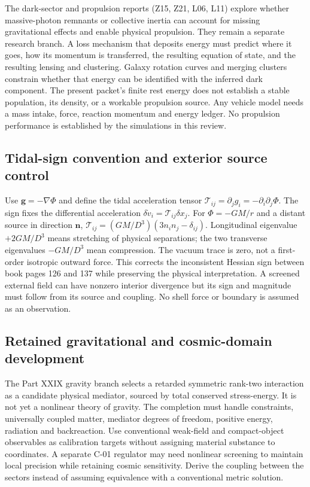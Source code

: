 \documentclass[
  11pt,
  twoside]{article}
\begin{document}
The dark-sector and propulsion reports (Z15, Z21, L06, L11) explore
whether massive-photon remnants or collective inertia can account for
missing gravitational effects and enable physical propulsion. They
remain a separate research branch. A loss mechanism that deposits energy
must predict where it goes, how its momentum is transferred, the
resulting equation of state, and the resulting lensing and clustering.
Galaxy rotation curves and merging clusters constrain whether that
energy can be identified with the inferred dark component. The present
packet's finite rest energy does not establish a stable population, its
density, or a workable propulsion source. Any vehicle model needs a mass
intake, force, reaction momentum and energy ledger. No propulsion
performance is established by the simulations in this review.

\subsection{Tidal-sign convention and exterior source
control}\label{tidal-sign-convention-and-exterior-source-control}

Use \(\mathbf g=-\nabla\Phi\) and define the tidal acceleration tensor
\(\mathcal T_{ij}=\partial_j g_i=-\partial_i\partial_j\Phi\). The sign
fixes the differential acceleration
\(\delta\dot v_i=\mathcal T_{ij}\delta x_j\). For \(\Phi=-GM/r\) and a
distant source in direction \(\mathbf n\),
\(\mathcal T_{ij}=(GM/D^3)(3n_in_j-\delta_{ij})\). Longitudinal
eigenvalue \(+2GM/D^3\) means stretching of physical separations; the
two transverse eigenvalues \(-GM/D^3\) mean compression. The vacuum
trace is zero, not a first-order isotropic outward force. This corrects
the inconsistent Hessian sign between book pages 126 and 137 while
preserving the physical interpretation. A screened external field can
have nonzero interior divergence but its sign and magnitude must follow
from its source and coupling. No shell force or boundary is assumed as
an observation.

\subsection{Retained gravitational and cosmic-domain
development}\label{retained-gravitational-and-cosmic-domain-development}

The Part XXIX gravity branch selects a retarded symmetric rank-two
interaction as a candidate physical mediator, sourced by total conserved
stress-energy. It is not yet a nonlinear theory of gravity. The
completion must handle constraints, universally coupled matter, mediator
degrees of freedom, positive energy, radiation and backreaction. Use
conventional weak-field and compact-object observables as calibration
targets without assigning material substance to coordinates. A separate
C-01 regulator may need nonlinear screening to maintain local precision
while retaining cosmic sensitivity. Derive the coupling between the
sectors instead of assuming equivalence with a conventional metric
solution.
\end{document}
